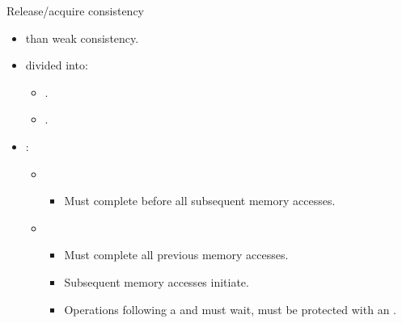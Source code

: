 \begin{frame}[t]{Release/acquire consistency}
\begin{itemize}
  \item {} than weak consistency.
  \item  {} divided into:
    \begin{itemize}
      \item {}. 
      \item {}. 
    \end{itemize}

  \item {}:
    \begin{itemize}
      \item {}
        \begin{itemize}
          \item Must complete before all subsequent memory accesses.
        \end{itemize}
      \item {}
        \begin{itemize}
          \item Must complete all previous memory accesses.
          \item Subsequent memory accesses  initiate.
          \item Operations following a  and must wait, must be protected with an .
        \end{itemize}
    \end{itemize}
\end{itemize}
\end{frame}
